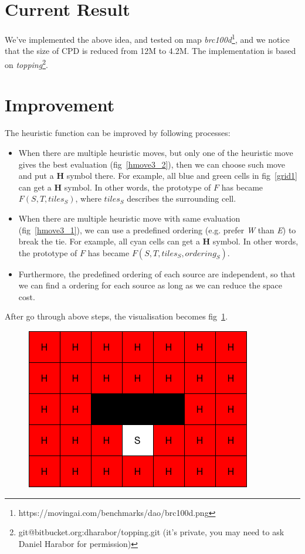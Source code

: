 \documentclass{article}
\begin{document}
\section{Current Result}
We've implemented the above idea, and tested on map
\textit{brc100d}\footnote{https://movingai.com/benchmarks/dao/brc100d.png}, and we notice that
the size of CPD is reduced from 12M to 4.2M. The implementation is based on
\textit{topping}\footnote{git@bitbucket.org:dharabor/topping.git (it's private, you may need to ask Daniel
Harabor for permission)}.

\section{Improvement}
The heuristic function can be improved by following processes:
\begin{itemize}
  \item When there are multiple heuristic moves, but only one of the heuristic
    move gives the best evaluation (fig~\ref{hmove3_2}), then we can choose such move and put a \textbf{H}
    symbol there. For example, all blue and green cells in fig~\ref{grid1} can get a \textbf{H} symbol.
    In other words, the prototype of $F$ has became $F(S, T, tiles_S)$, where
    $tiles_S$ describes the surrounding cell.

  \item When there are multiple heuristic move with same evaluation (fig~\ref{hmove3_1}), we
    can use a predefined ordering (e.g. prefer \textit{W} than \textit{E}) to break the tie. For example, all cyan cells can get
    a \textbf{H} symbol. In other words, the prototype of $F$ has became $F(S, T, tiles_S, ordering_S)$.

  \item Furthermore, the predefined ordering of each source are independent, so that we can
    find a ordering for each source as long as we can reduce the space cost.

\end{itemize}

After go through above steps, the visualisation becomes fig~\ref{grid2}.

\begin{figure}[t]
  \centering
  \includegraphics[width=.5\textwidth]{./grid2.png}
  \caption{}
  \label{grid2}
\end{figure}
\end{document}
